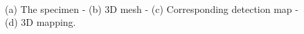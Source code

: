 \begin{figure}
  \centering
	
  \hspace*{\fill}
  \hfill
	\hspace*{\fill} \\ \hspace*{\fill}
   \hfill
  \hspace*{\fill}
	
	\caption{(a) The specimen - (b) 3D mesh - (c) Corresponding detection map - (d) 3D mapping.}
  \label{fig:8}
\end{figure}
